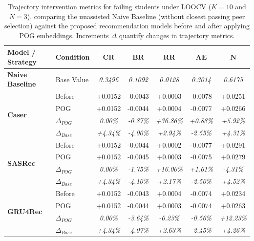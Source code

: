 \begin{table}[th!]
\centering
\caption{Trajectory intervention metrics for failing students under LOOCV ($K=10$ and $N=3$), comparing the unassisted Naive Baseline (without closest passing peer selection) against the proposed recommendation models before and after applying POG embeddings. Increments $\Delta$ quantify changes in trajectory metrics.}
\label{tab:resfail}
\begin{tabular}{llccccc}
\hline
\textbf{Model / Strategy} & \textbf{Condition} & $\mathbf{CR}$ & $\mathbf{BR}$ & $\mathbf{RR}$ & $\mathbf{AE}$ & $\mathbf{N}$ \\
\hline
\multirow{1}{*}{\textbf{Naive Baseline}} 
 & Base Value & \textit{0.3496} & \textit{0.1092} & \textit{0.0128} & \textit{0.3014} & \textit{0.6175} \\
\hline
\multirow{4}{*}{\textbf{Caser}} 
 & Before & +0.0152 & -0.0043 & +0.0003 & -0.0078 & +0.0251 \\
 & POG & +0.0152 & -0.0044 & +0.0004 & -0.0077 & +0.0266 \\
 & $\Delta_{POG}$ & \textit{0.00\%} & \textit{-0.87\%} & \textit{+36.86\%} & \textit{+0.88\%} & \textit{+5.92\%} \\
 & \textit{$\Delta_{Base}$} & \textit{+4.34\%} & \textit{-4.00\%} & \textit{+2.94\%} & \textit{-2.55\%} & \textit{+4.31\%} \\
\hline
\multirow{4}{*}{\textbf{SASRec}} 
 & Before & +0.0152 & -0.0044 & +0.0002 & -0.0077 & +0.0291 \\
 & POG & +0.0152 & -0.0045 & +0.0003 & -0.0075 & +0.0279 \\
 & $\Delta_{POG}$ & \textit{0.00\%} & \textit{-1.75\%} & \textit{+16.00\%} & \textit{+1.61\%} & \textit{-4.31\%} \\
 & \textit{$\Delta_{Base}$} & \textit{+4.34\%} & \textit{-4.10\%} & \textit{+2.17\%} & \textit{-2.50\%} & \textit{+4.52\%} \\
\hline
\multirow{4}{*}{\textbf{GRU4Rec}} 
 & Before & +0.0152 & -0.0043 & +0.0004 & -0.0074 & +0.0234 \\
 & POG & +0.0152 & -0.0044 & +0.0003 & -0.0074 & +0.0263 \\
 & $\Delta_{POG}$ & \textit{0.00\%} & \textit{-3.64\%} & \textit{-6.23\%} & \textit{-0.56\%} & \textit{+12.23\%} \\
 & \textit{$\Delta_{Base}$} & \textit{+4.34\%} & \textit{-4.07\%} & \textit{+2.63\%} & \textit{-2.45\%} & \textit{+4.26\%} \\
\hline
\end{tabular}
\end{table}
